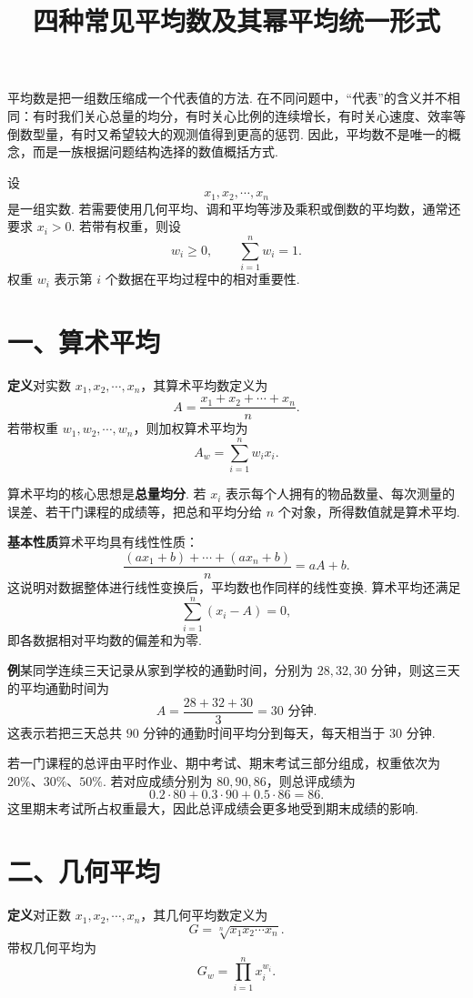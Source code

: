 \documentclass[UTF8,12pt,a4paper,fontset=fandol]{ctexart}
\title{四种常见平均数及其幂平均统一形式}
\author{}
\date{}
\begin{document}
\maketitle

平均数是把一组数压缩成一个代表值的方法. 在不同问题中，``代表''的含义并不相同：有时我们关心总量的均分，有时关心比例的连续增长，有时关心速度、效率等倒数型量，有时又希望较大的观测值得到更高的惩罚. 因此，平均数不是唯一的概念，而是一族根据问题结构选择的数值概括方式.

设
\[
  x_1,x_2,\cdots,x_n
\]
是一组实数. 若需要使用几何平均、调和平均等涉及乘积或倒数的平均数，通常还要求 $x_i>0$. 若带有权重，则设
\[
  w_i\ge0,\qquad \sum_{i=1}^n w_i=1.
\]
权重 $w_i$ 表示第 $i$ 个数据在平均过程中的相对重要性.

\section*{一、算术平均}

\noindent\textbf{定义}\quad 对实数 $x_1,x_2,\cdots,x_n$，其算术平均数定义为
\[
  A=\frac{x_1+x_2+\cdots+x_n}{n}.
\]
若带权重 $w_1,w_2,\cdots,w_n$，则加权算术平均为
\[
  A_w=\sum_{i=1}^n w_i x_i.
\]

算术平均的核心思想是\textbf{总量均分}. 若 $x_i$ 表示每个人拥有的物品数量、每次测量的误差、若干门课程的成绩等，把总和平均分给 $n$ 个对象，所得数值就是算术平均.

\noindent\textbf{基本性质}\quad 算术平均具有线性性质：
\[
  \frac{(ax_1+b)+\cdots+(ax_n+b)}{n}
  =aA+b.
\]
这说明对数据整体进行线性变换后，平均数也作同样的线性变换. 算术平均还满足
\[
  \sum_{i=1}^n (x_i-A)=0,
\]
即各数据相对平均数的偏差和为零.

\noindent\textbf{例}\quad 某同学连续三天记录从家到学校的通勤时间，分别为 $28,32,30$ 分钟，则这三天的平均通勤时间为
\[
  A=\frac{28+32+30}{3}=30\text{ 分钟}.
\]
这表示若把三天总共 $90$ 分钟的通勤时间平均分到每天，每天相当于 $30$ 分钟.

若一门课程的总评由平时作业、期中考试、期末考试三部分组成，权重依次为 $20\%$、$30\%$、$50\%$. 若对应成绩分别为 $80,90,86$，则总评成绩为
\[
  0.2\cdot80+0.3\cdot90+0.5\cdot86=86.
\]
这里期末考试所占权重最大，因此总评成绩会更多地受到期末成绩的影响.

\section*{二、几何平均}

\noindent\textbf{定义}\quad 对正数 $x_1,x_2,\cdots,x_n$，其几何平均数定义为
\[
  G=\sqrt[n]{x_1x_2\cdots x_n}.
\]
带权几何平均为
\[
  G_w=\prod_{i=1}^n x_i^{w_i}.
\]
\end{document}
